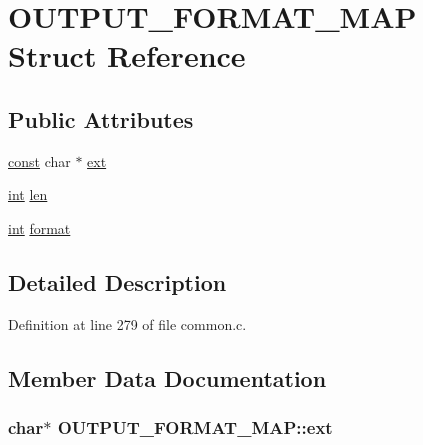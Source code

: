 \hypertarget{struct_o_u_t_p_u_t___f_o_r_m_a_t___m_a_p}{}\section{O\+U\+T\+P\+U\+T\+\_\+\+F\+O\+R\+M\+A\+T\+\_\+\+M\+AP Struct Reference}
\label{struct_o_u_t_p_u_t___f_o_r_m_a_t___m_a_p}
\subsection*{Public Attributes}
\begin{DoxyCompactItemize}
\item 
\hyperlink{getopt1_8c_a2c212835823e3c54a8ab6d95c652660e}{const} char $\ast$ \hyperlink{struct_o_u_t_p_u_t___f_o_r_m_a_t___m_a_p_a732536fdcfc0038443e61ea4ae2f4105}{ext}
\item 
\hyperlink{xmltok_8h_a5a0d4a5641ce434f1d23533f2b2e6653}{int} \hyperlink{struct_o_u_t_p_u_t___f_o_r_m_a_t___m_a_p_a551e605a9b11c5962d7379e799541321}{len}
\item 
\hyperlink{xmltok_8h_a5a0d4a5641ce434f1d23533f2b2e6653}{int} \hyperlink{struct_o_u_t_p_u_t___f_o_r_m_a_t___m_a_p_afdfa185f8b133270305131925e06b168}{format}
\end{DoxyCompactItemize}


\subsection{Detailed Description}


Definition at line 279 of file common.\+c.



\subsection{Member Data Documentation}
\subsubsection[{\texorpdfstring{ext}{ext}}]{ char$\ast$ O\+U\+T\+P\+U\+T\+\_\+\+F\+O\+R\+M\+A\+T\+\_\+\+M\+A\+P\+::ext}\hypertarget{struct_o_u_t_p_u_t___f_o_r_m_a_t___m_a_p_a732536fdcfc0038443e61ea4ae2f4105}{}\label{struct_o_u_t_p_u_t___f_o_r_m_a_t___m_a_p_a732536fdcfc0038443e61ea4ae2f4105}


